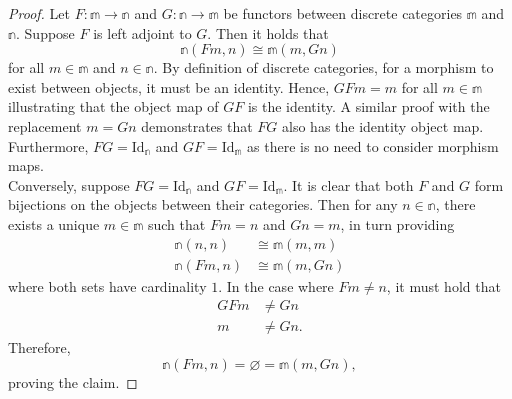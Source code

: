 \documentclass[ 12pt ]{article}
\begin{document}
\begin{enumerate}
		\begin{proof}
			Let $F : \mathbb{m} \to \mathbb{n}$ and $G : \mathbb{n} \to \mathbb{m}$ be functors between discrete categories $\mathbb{m}$ and $\mathbb{n}$. Suppose $F$ is left adjoint to $G$. Then it holds that $$\mathbb{n}(Fm, n) \cong \mathbb{m}(m, Gn)$$ for all $m \in \mathbb{m}$ and $n \in \mathbb{n}$. By definition of discrete categories, for a morphism to exist between objects, it must be an identity. Hence, $GF m = m$ for all $m \in \mathbb{m}$ illustrating that the object map of $GF$ is the identity. A similar proof with the replacement $m = Gn$ demonstrates that $FG$ also has the identity object map. Furthermore, $FG = \mathrm{Id}_\mathbb{n}$ and $GF = \mathrm{Id}_\mathbb{m}$ as there is no need to consider morphism maps. \\

			Conversely, suppose $FG = \mathrm{Id}_\mathbb{n}$ and $GF = \mathrm{Id}_\mathbb{m}$. It is clear that both $F$ and $G$ form bijections on the objects between their categories. Then for any $n \in \mathbb{n}$, there exists a unique $m \in \mathbb{m}$ such that $Fm = n$ and $Gn = m$, in turn providing
			\begin{align*}
				\mathbb{n}(n, n) &\cong \mathbb{m}(m, m) \\
				\mathbb{n}(Fm, n) &\cong \mathbb{m}(m, Gn)
			\end{align*}
			where both sets have cardinality $1$. In the case where $Fm \neq n$, it must hold that
			\begin{align*}
				GF m &\neq Gn \\
				m &\neq Gn.
			\end{align*}
			Therefore, $$\mathbb{n}(Fm, n) = \varnothing = \mathbb{m}(m, Gn),$$ proving the claim.
		\end{proof}

\end{enumerate}
\end{document}
